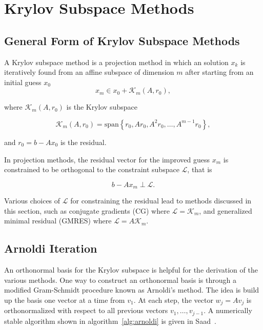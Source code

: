 \chapter{Krylov Subspace Methods}
\label{chapter:KrylovSolvers}
\section{General Form of Krylov Subspace Methods}
A Krylov subspace method is a projection method in which an solution $x_k$ is iteratively found from an affine subspace of dimension $m$ after starting from an initial guess $x_0$
\begin{equation}
    x_m \in x_0 + \mathcal{K}_m(A, r_0),
\end{equation}

where $\mathcal{K}_m(A, r_0)$ is the Krylov subspace

\begin{equation}
    \mathcal{K}_m(A, r_0) = \text{span}\left\{r_0, Ar_0, A^2r_0, \ldots, A^{m-1}r_0 \right\},
\end{equation}

and $r_0 = b - Ax_0$ is the residual.

In projection methods, the residual vector for the improved guess $x_m$ is constrained to be orthogonal to the constraint subspace $\mathcal{L}$, that is

\begin{equation}
    \label{eq:constraint_space}
    b - Ax_m \perp \mathcal{L}.
\end{equation}

Various choices of $\mathcal{L}$ for constraining the residual lead to methods discussed in this section, such as conjugate gradients (CG) where $\mathcal{L} = \mathcal{K}_m$, and generalized minimal residual (GMRES) where $\mathcal{L} = A\mathcal{K}_m$.

\section{Arnoldi Iteration}
An orthonormal basis for the Krylov subspace is helpful for the derivation of the various methods. One way to construct an orthonormal basis is through a modified Gram-Schmidt procedure known as Arnoldi's method. The idea is build up the basis one vector at a time from $v_1$. At each step, the vector $w_j = Av_j$ is orthonormalized with respect to all previous vectors $v_1, \ldots, v_{j-1}$. A numerically stable algorithm shown in algorithm~\ref{alg:arnoldi} is given in Saad~\cite{Saad2003}.

